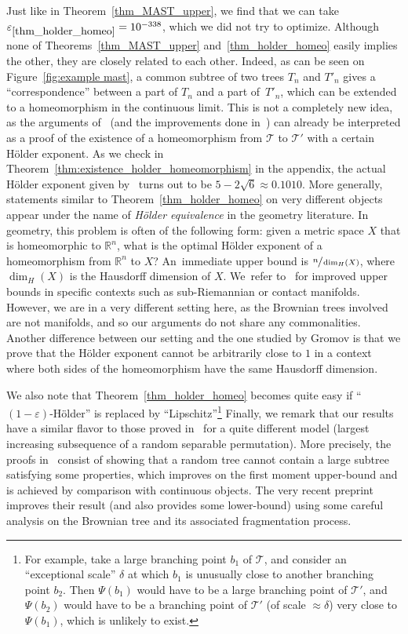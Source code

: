 \documentclass[11pt]{article}
\newcommand{\Tt}{\mathcal{T}}
\let\eps\varepsilon
\theoremstyle{plain}
\theoremstyle{definition}
\numberwithin{equation}{section}
\begin{document}
Just like in Theorem~\ref{thm_MAST_upper}, we find that we can take $\eps_{\ref{thm_holder_homeo}}=10^{-338}$, which we did not try to optimize.
Although none of Theorems~\ref{thm_MAST_upper} and~\ref{thm_holder_homeo} easily implies the other, they are closely related to each other.
Indeed, as can be seen on Figure~\ref{fig:example mast}, a common subtree of two trees $T_n$ and $T'_n$ gives a ``correspondence'' between a part of $T_n$ and a part of~$T'_n$, which can be extended to a homeomorphism in the continuous limit.
This is not a completely new idea, as the arguments of~\cite{aldous_largest_2022} (and the improvements done in~\cite{Khez22}) can already be interpreted as a proof of the existence of a homeomorphism from $\Tt$ to $\Tt'$ with a certain Hölder exponent.
As we check in Theorem~\ref{thm:existence_holder_homeomorphism} in the appendix, the actual Hölder exponent given by~\cite{aldous_largest_2022} turns out to be $5-2\sqrt{6}\approx 0.1010$.
More generally, statements similar to Theorem~\ref{thm_holder_homeo} on very different objects appear under the name of \emph{Hölder equivalence} in the geometry literature.
In geometry, this problem is often of the following form: given a metric space $X$ that is homeomorphic to $\mathbb{R}^n$, what is the optimal Hölder exponent of a homeomorphism from $\mathbb{R}^n$ to $X$?
An~immediate upper bound is $\sfrac{n}{\dim_H(X)}$, where $\dim_H(X)$ is the Hausdorff dimension of $X$.
We~refer to~\cite{Gromov96} for improved upper bounds in specific contexts such as sub-Riemannian or contact manifolds.
However, we are in a very different setting here, as the Brownian trees involved are not manifolds, and so our arguments do not share any commonalities.
Another difference between our setting and the one studied by Gromov is that we prove that the Hölder exponent cannot be arbitrarily close to $1$ in a context where both sides of the homeomorphism have the same Hausdorff dimension.\enlargethispage{\baselineskip}%

We also note that Theorem~\ref{thm_holder_homeo} becomes quite easy if ``$(1-\eps)$-Hölder'' is replaced by ``Lipschitz''\footnote{For example, take a large branching point $b_1$ of $\Tt$, and consider an ``exceptional scale'' $\delta$ at which $b_1$ is unusually close to another branching point $b_2$.
Then $\Psi(b_1)$ would have to be a large branching point of $\Tt'$, and $\Psi(b_2)$ would have to be a branching point of $\Tt'$ (of scale $\approx \delta$) very close to $\Psi(b_1)$, which is unlikely to exist.}
Finally, we remark that our results have a similar flavor to those proved in~\cite[Th.\,1.2, Th.\,1.7]{BBDFGMP22} for a quite different model (largest increasing subsequence of a random separable permutation). More precisely, the proofs in~\cite{BBDFGMP22} consist of showing that a random tree cannot contain a large subtree satisfying some properties, which improves on the first moment upper-bound and is achieved by comparison with continuous objects.
The very recent preprint \cite{borga_power_2023} improves their result (and also provides some lower-bound) using some careful analysis on the Brownian tree and its associated fragmentation process.
\end{document}
